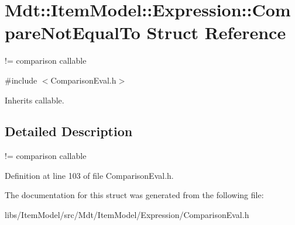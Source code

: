\hypertarget{struct_mdt_1_1_item_model_1_1_expression_1_1_compare_not_equal_to}{}\section{Mdt\+:\+:Item\+Model\+:\+:Expression\+:\+:Compare\+Not\+Equal\+To Struct Reference}
\label{struct_mdt_1_1_item_model_1_1_expression_1_1_compare_not_equal_to}


!= comparison callable  




{\ttfamily \#include $<$Comparison\+Eval.\+h$>$}



Inherits callable.



\subsection{Detailed Description}
!= comparison callable 

Definition at line 103 of file Comparison\+Eval.\+h.



The documentation for this struct was generated from the following file\+:\begin{DoxyCompactItemize}
\item 
libs/\+Item\+Model/src/\+Mdt/\+Item\+Model/\+Expression/Comparison\+Eval.\+h\end{DoxyCompactItemize}
